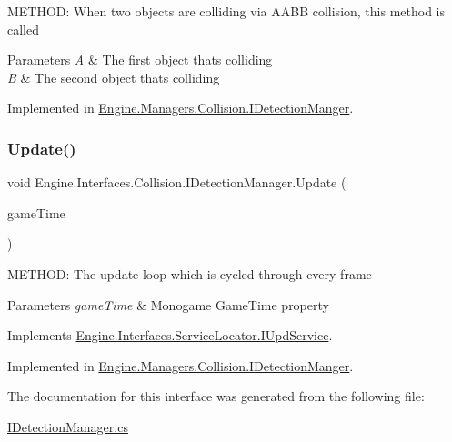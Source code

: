 M\+E\+T\+H\+OD\+: When two objects are colliding via A\+A\+BB collision, this method is called 


\begin{DoxyParams}{Parameters}
{\em A} & The first object that\textquotesingle{}s colliding\\
\hline
{\em B} & The second object that\textquotesingle{}s colliding\\
\hline
\end{DoxyParams}


Implemented in \hyperlink{a00502_a31a209d98a58cac4f6abd47711bf545c}{Engine.\+Managers.\+Collision.\+I\+Detection\+Manger}.

\mbox{\label{a00430_aeaa36b46e3ecd301b2fce9197fb0a35c}} 
\subsubsection{\texorpdfstring{Update()}{Update()}}
{\footnotesize\ttfamily void Engine.\+Interfaces.\+Collision.\+I\+Detection\+Manager.\+Update (\begin{DoxyParamCaption}\item[{Game\+Time}]{game\+Time }\end{DoxyParamCaption})}



M\+E\+T\+H\+OD\+: The update loop which is cycled through every frame 


\begin{DoxyParams}{Parameters}
{\em game\+Time} & Monogame Game\+Time property\\
\hline
\end{DoxyParams}


Implements \hyperlink{a00478_a387fce2a5440a4dc63f8d72772ecbdaa}{Engine.\+Interfaces.\+Service\+Locator.\+I\+Upd\+Service}.



Implemented in \hyperlink{a00502_ac032340610657f865bdd3b7a82e316c3}{Engine.\+Managers.\+Collision.\+I\+Detection\+Manger}.



The documentation for this interface was generated from the following file\+:\begin{DoxyCompactItemize}
\item 
\hyperlink{a00104}{I\+Detection\+Manager.\+cs}\end{DoxyCompactItemize}
